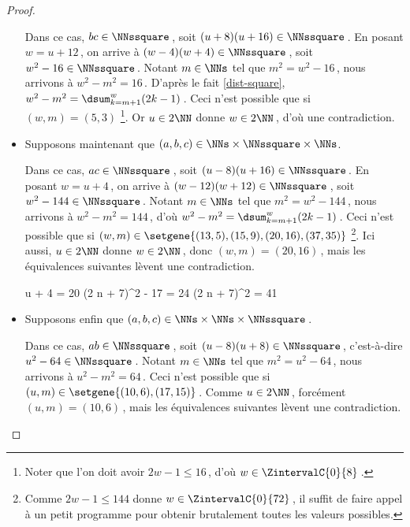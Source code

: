 \begin{proof}
\begin{itemize}
		\smallskip
		\noindent
		Dans ce cas, $bc \in \NNssquare$\,, soit $(u + 8) (u + 16) \in \NNssquare$\,.
		En posant $w = u + 12$\,, on arrive à $(w - 4) (w + 4) \in \NNssquare$\,, soit $w^2 - 16 \in \NNssquare$\,.
		Notant $m \in \NNs$ tel que $m^2 = w^2 - 16$\,, nous arrivons à $w^2 - m^2 = 16$\,.
		D'après le fait \ref{dist-square}, $w^2 - m^2 = \dsum_{k=m+1}^{w} (2 k - 1)$\,.
		Ceci n'est possible que si $(w, m) = (5, 3)$
		\footnote{
			Noter que l'on doit avoir $2 w - 1 \leq 16$\,, d'où $w \in \ZintervalC{0}{8}$\,.
		}.
		Or $u \in 2 \NN$ donne $w \in 2 \NN$\,, d'où une contradiction.		
		
		
		\medskip
		\item Supposons maintenant que $(a, b, c) \in \NNs \times \NNssquare \times \NNs$. 
		
		\smallskip
		\noindent
		Dans ce cas, $ac \in \NNssquare$\,, soit $(u - 8) (u + 16) \in \NNssquare$\,.
		En posant $w = u + 4$\,, on arrive à $(w - 12) (w + 12) \in \NNssquare$\,, soit $w^2 - 144 \in \NNssquare$\,.
		Notant $m \in \NNs$ tel que $m^2 = w^2 - 144$\,, nous arrivons à $w^2 - m^2 = 144$\,, d'où $w^2 - m^2 = \dsum_{k=m+1}^{w} (2 k - 1)$\,.
		Ceci n'est possible que si $(w, m) \in \setgene{(13, 5) , (15, 9) , (20, 16) , (37, 35)}$
		\footnote{
			Comme $2 w - 1 \leq 144$ donne $w \in \ZintervalC{0}{72}$\,, il suffit de faire appel à un petit programme pour obtenir brutalement toutes les valeurs possibles.
		}.
		Ici aussi, $u \in 2 \NN$ donne $w \in 2 \NN$\,, donc $(w, m) = (20, 16)$\,, mais les équivalences suivantes lèvent une contradiction.

		\medskip
		\noindent\!\!%
   		\begin{stepcalc}[style = sar, ope = \iff]
			u + 4 = 20
		\explnext{}
			(2 n + 7)^2 - 17 = 24
		\explnext*{$41 \notin \NNsquare$}{}
			(2 n + 7)^2 = 41
		\end{stepcalc}	
		
		
		\medskip
		\item Supposons enfin que $(a, b, c) \in \NNs \times \NNs \times \NNssquare$\,. 
		
		\smallskip
		\noindent
		Dans ce cas, $ab \in \NNssquare$\,, soit $(u - 8) (u + 8) \in \NNssquare$\,, c'est-à-dire $u^2 - 64 \in \NNssquare$\,.
		Notant $m \in \NNs$ tel que $m^2 = u^2 - 64$\,, nous arrivons à $u^2 - m^2 = 64$\,.
		Ceci n'est possible que si $(u, m) \in \setgene{(10, 6), (17, 15)}$\,.
		Comme $u \in 2 \NN$\,, forcément $(u, m) = (10, 6)$\,, mais les équivalences suivantes lèvent une contradiction.


\end{itemize}
\end{proof}
